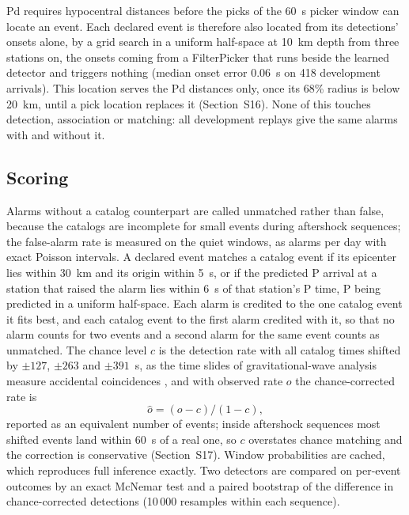 \documentclass[a4paper,fleqn]{cas-sc}
\begin{document}
Pd requires hypocentral distances before the picks of the 60~s picker window can
locate an event. Each declared event is therefore also located from its detections'
onsets alone, by a grid search in a uniform half-space at 10~km depth from three
stations on, the onsets coming from a FilterPicker that runs beside the learned
detector and triggers nothing (median onset error 0.06~s on 418 development arrivals).
This location serves the Pd distances only, once its 68\% radius is below 20~km, until
a pick location replaces it (Section~S16). None of this touches detection,
association or matching: all development replays give the same alarms with and
without it.

\subsection{Scoring}\label{sec:protocols}

Alarms without a catalog counterpart are called unmatched rather than false, because
the catalogs are incomplete for small events during aftershock sequences; the
false-alarm rate is measured on the quiet windows, as alarms per day with exact
Poisson intervals. A declared event matches a catalog event if its epicenter lies
within 30~km and its origin within 5~s, or if the predicted P arrival at a station that raised the alarm
lies within 6~s of that station's P time, P being predicted in a uniform half-space.
Each alarm is credited to the one catalog event it fits best, and each catalog event
to the first alarm credited with it, so that no alarm counts for two events and a
second alarm for the same event counts as unmatched. The chance level $c$ is the
detection rate with all catalog times shifted by $\pm 127$, $\pm 263$ and $\pm 391$~s,
as the time slides of gravitational-wave analysis measure accidental coincidences
\citep{was2010},
and with observed rate $o$ the chance-corrected rate is
\begin{equation}\label{eq:chance}
  \hat{o} = (o - c)/(1 - c),
\end{equation}
reported as an equivalent number of events; inside aftershock sequences most shifted
events land within 60~s of a real one, so $c$ overstates chance matching and the
correction is conservative (Section~S17). Window probabilities are cached, which
reproduces full inference exactly. Two detectors are compared on per-event outcomes
by an exact McNemar test and a paired bootstrap of the difference in chance-corrected
detections (10\,000 resamples within each sequence).
\end{document}
